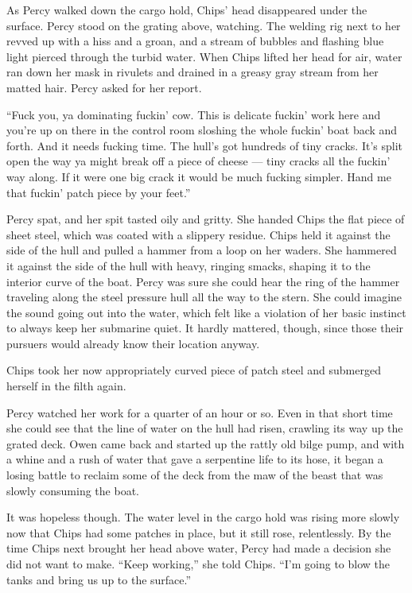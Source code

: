 \documentclass[
]{scrbook}
\begin{document}
As Percy walked down the cargo hold, Chips' head disappeared under the
surface. Percy stood on the grating above, watching. The welding rig
next to her revved up with a hiss and a groan, and a stream of bubbles
and flashing blue light pierced through the turbid water. When Chips
lifted her head for air, water ran down her mask in rivulets and drained
in a greasy gray stream from her matted hair. Percy asked for her
report.

``Fuck you, ya dominating fuckin' cow. This is delicate fuckin' work
here and you're up on there in the control room sloshing the whole
fuckin' boat back and forth. And it needs fucking time. The hull's got
hundreds of tiny cracks. It's split open the way ya might break off a
piece of cheese --- tiny cracks all the fuckin' way along. If it were
one big crack it would be much fucking simpler. Hand me that fuckin'
patch piece by your feet.''

Percy spat, and her spit tasted oily and gritty. She handed Chips the
flat piece of sheet steel, which was coated with a slippery residue.
Chips held it against the side of the hull and pulled a hammer from a
loop on her waders. She hammered it against the side of the hull with
heavy, ringing smacks, shaping it to the interior curve of the boat.
Percy was sure she could hear the ring of the hammer traveling along the
steel pressure hull all the way to the stern. She could imagine the
sound going out into the water, which felt like a violation of her basic
instinct to always keep her submarine quiet. It hardly mattered, though,
since those their pursuers would already know their location anyway.

Chips took her now appropriately curved piece of patch steel and
submerged herself in the filth again.

Percy watched her work for a quarter of an hour or so. Even in that
short time she could see that the line of water on the hull had risen,
crawling its way up the grated deck. Owen came back and started up the
rattly old bilge pump, and with a whine and a rush of water that gave a
serpentine life to its hose, it began a losing battle to reclaim some of
the deck from the maw of the beast that was slowly consuming the boat.

It was hopeless though. The water level in the cargo hold was rising
more slowly now that Chips had some patches in place, but it still rose,
relentlessly. By the time Chips next brought her head above water, Percy
had made a decision she did not want to make. ``Keep working,'' she told
Chips. ``I'm going to blow the tanks and bring us up to the surface.''
\end{document}
